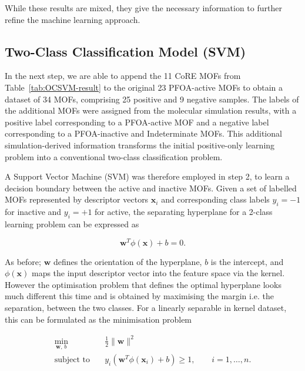 \documentclass[twoside,twocolumn,9pt]{article}
\begin{document}
While these results are mixed, they give the necessary information to further refine the machine learning approach.

\subsection{Two-Class Classification Model (SVM)}\label{sec:method-2_SVM}

In the next step, we are able to append the 11 CoRE MOFs from Table~\ref{tab:OCSVM-result} to the original 23 PFOA-active MOFs to obtain a dataset of 34 MOFs, comprising 25 positive and 9 negative samples. The labels of the additional MOFs were assigned from the molecular simulation results, with a positive label corresponding to a PFOA-active MOF and a negative label corresponding to a PFOA-inactive and Indeterminate MOFs. This additional simulation-derived information transforms the initial positive-only learning problem into a conventional two-class classification problem.

A Support Vector Machine (SVM) was therefore employed in step 2, to learn a decision boundary between the active and inactive MOFs. Given a set of labelled MOFs represented by descriptor vectors $\mathbf{x}_i$ and corresponding class labels $y_i = -1$ for inactive and $y_i = +1$ for active, the separating hyperplane for a 2-class learning problem can be expressed as

\begin{equation}
	\mathbf{w}^{T}\phi(\mathbf{x}) + b = 0.
	\label{eq:svm-hyperplane}
\end{equation}

As before; $\mathbf{w}$ defines the orientation of the hyperplane, $b$ is the intercept, and $\phi(\mathbf{x})$ maps the input descriptor vector into the feature space via the kernel. However the optimisation problem that defines the optimal hyperplane looks much different this time and is obtained by maximising the margin i.e. the separation, between the two classes. For a linearly separable in kernel dataset, this can be formulated as the minimisation problem

\begin{equation}
	\begin{aligned}
		\min_{\mathbf{w},\,b}\quad
		& \frac{1}{2}\|\mathbf{w}\|^2 \\
		\text{subject to}\quad
		& y_i\left(\mathbf{w}^{T}\phi(\mathbf{x}_i)+b\right) \geq 1,
		\qquad i=1,\ldots,n.
	\end{aligned}
	\label{eq:svm-hard}
\end{equation}
\end{document}
